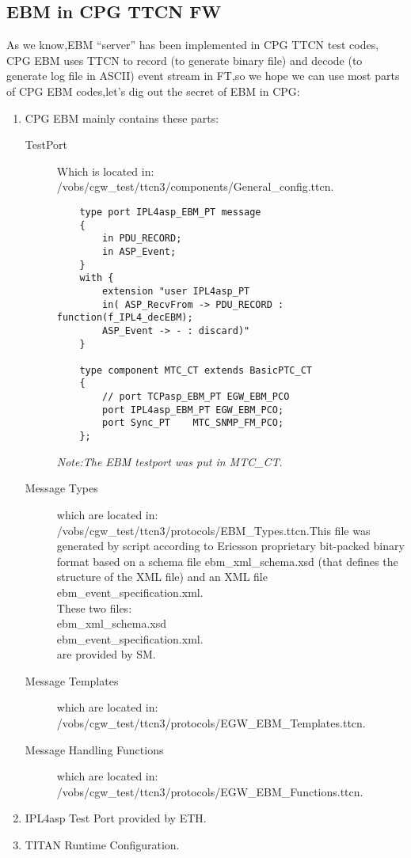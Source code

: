 \documentclass[a4paper,11pt]{article}
\begin{document}
\subsection{EBM in CPG TTCN FW}
As we know,EBM ``server'' has been implemented in CPG TTCN test codes, CPG EBM uses TTCN to record (to generate binary file) and decode (to generate log file in ASCII) event stream in FT,so we hope we can use most parts of CPG EBM codes,let's dig out the secret of EBM in CPG:\\
\flushleft
\begin{enumerate}
\item CPG EBM mainly contains these parts:
\begin{description}
\item[TestPort] Which is located in: /vobs/cgw\_test/ttcn3/components/General\_config.ttcn.
\begin{verbatim}
    type port IPL4asp_EBM_PT message
    {
        in PDU_RECORD;
        in ASP_Event;
    }
    with {
        extension "user IPL4asp_PT
        in( ASP_RecvFrom -> PDU_RECORD : function(f_IPL4_decEBM);
        ASP_Event -> - : discard)"
    }

    type component MTC_CT extends BasicPTC_CT
    {
        // port TCPasp_EBM_PT EGW_EBM_PCO
        port IPL4asp_EBM_PT EGW_EBM_PCO;
        port Sync_PT    MTC_SNMP_FM_PCO;
    };
\end{verbatim}
\emph{Note:The EBM testport was put in MTC\_CT}.
\item[Message Types] which are located in: /vobs/cgw\_test/ttcn3/protocols/EBM\_Types.ttcn.This file was generated by script according to Ericsson proprietary bit-packed binary format based on a schema file ebm\_xml\_schema.xsd (that defines the structure of the XML file) and an XML file ebm\_event\_specification.xml.\\
    These two files:\\
    \textsf{ebm\_xml\_schema.xsd\\
    ebm\_event\_specification.xml.\\
    }
    are provided by SM.
\item[Message Templates] which are located in:\\/vobs/cgw\_test/ttcn3/protocols/EGW\_EBM\_Templates.ttcn.
\item[Message Handling Functions] which are located in:\\/vobs/cgw\_test/ttcn3/protocols/EGW\_EBM\_Functions.ttcn.
\end{description}
\item IPL4asp Test Port provided by ETH.
\item TITAN Runtime Configuration.
\end{enumerate}
\end{document}
